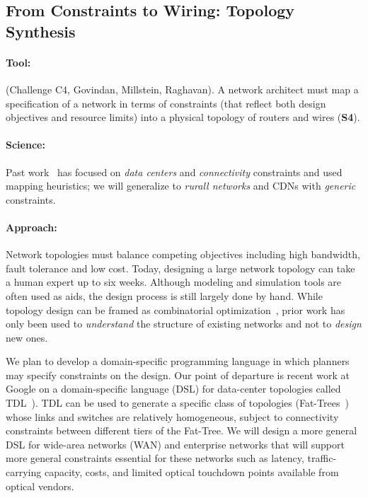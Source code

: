 \subsection{From Constraints to Wiring: Topology Synthesis}

\paragraph*{Tool:} (Challenge C4, Govindan, Millstein, Raghavan). A network
architect must map a specification of a network in terms of
constraints (that reflect both design objectives and resource limits)
into a physical topology of routers and wires ({\bf S4}).
%
\paragraph*{Science:} Past work~\cite{condor} has focused on {\em data
  centers} and {\em connectivity} constraints and used mapping
heuristics; we will generalize to {\em rurall networks} and CDNs with {\em
  generic} constraints.



\paragraph*{Approach:}
%
Network topologies must balance competing objectives including high
bandwidth, fault tolerance and low cost. Today, designing a large
network topology can take a human expert up to six weeks. Although
modeling and simulation tools are often used as aids, the design
process is still largely done by hand.  While topology design can be
framed as combinatorial optimization~\cite{PA,
  Hongsuda,HOT}, prior work has only been used to {\em understand}
the structure of existing networks and not to {\em design} new ones.

We plan to develop a domain-specific programming language in which
planners may specify constraints on the design.  Our point of
departure is recent work at Google on a domain-specific language (DSL)
for data-center topologies called TDL~\cite{condor}). TDL can be used
to generate a specific class of topologies (Fat-Trees~\cite{FatTree})
whose links and switches are relatively homogeneous, subject to
connectivity constraints between different tiers of the Fat-Tree. We
will design a more general DSL for wide-area networks (WAN) and
enterprise networks that will support more general constraints
essential for these networks such as latency, traffic-carrying
capacity, costs, and limited optical touchdown points available from
optical vendors.

